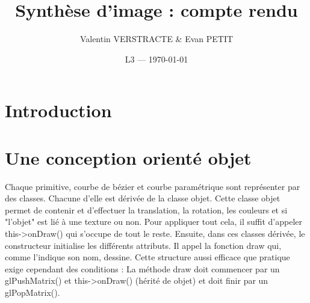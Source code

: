 \documentclass{article}
\title{Synthèse d'image : compte rendu} %
\author{Valentin VERSTRACTE \& Evan PETIT}
\date{L3 --- \today} %
\begin{document}
\maketitle %


\section*{Introduction} %


\section{Une conception orienté objet} %

Chaque primitive, courbe de bézier et courbe paramétrique sont représenter par des classes. Chacune d'elle est dérivée de la classe objet. Cette classe objet permet de contenir et d'effectuer la translation, la rotation, les couleurs et si "l'objet" est lié à une texture ou non. Pour appliquer tout cela, il suffit d'appeler this->onDraw() qui s'occupe de tout le reste. Ensuite, dans ces classes dérivée, le constructeur initialise les différents attributs. Il appel la fonction draw qui, comme l'indique son nom, dessine. Cette structure aussi efficace que pratique exige cependant des conditions : La méthode draw doit commencer par un glPushMatrix() et this->onDraw() (hérité de objet) et doit finir par un glPopMatrix(). 
\end{document}

